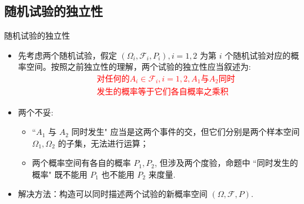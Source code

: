 \subsection{随机试验的独立性}
 \begin{frame}{随机试验的独立性}

  \begin{itemize}[<+-|alert@+>]
  \item 先考虑两个随机试验，假定 $(\Omega_i,\mathcal{F}_i,P_i), i=1,2$ 为第 $i$ 个随机试验对应的概率空间。按照之前独立性的理解，两个试验的独立性应当叙述为:\pause
   \textcolor{red}{ \begin{eqnarray*}
      &&\mbox{对任何的} A_i\in\mathcal{F}_i, i=1,2, A_1\mbox{与} A_2\mbox{同时}\\
      &&\mbox{发生的概率等于它们各自概率之乘积}
    \end{eqnarray*}}%
\item 两个不妥:
  \begin{itemize}[<+-|alert@+>]
  \item ``$A_1$ 与 $A_2$ 同时发生" 应当是这两个事件的交，但它们分别是两个样本空间 $\Omega_1,\Omega_2$ 的子集，无法进行运算；
  \item 两个概率空间有各自的概率 $P_1, P_2$, 但涉及两个度验，命题中 ``同时发生的概率" 既不能用 $P_1$ 也不能用 $P_2$ 来度量.
  \end{itemize}
\item 解决方法：构造可以同时描述两个试验的新概率空间 $(\Omega,\mathcal{F},P)$.
  \end{itemize}
\end{frame}
